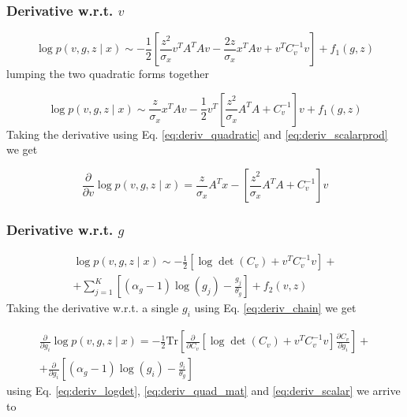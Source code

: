 \documentclass{paper}
\begin{document}
\subsubsection{Derivative w.r.t. $v$}

\begin{equation}
\log p(v,g,z \mid x) \sim - \frac{1}{2} \left[ \frac{z^2}{ \sigma_x} v^TA^TAv - \frac{2z}{ \sigma_x}  x^TAv +  v^T C_v^{-1} v \right]  + f_1(g,z)
\end{equation}
%
lumping the two quadratic forms together

\begin{equation}
\log p(v,g,z \mid x) \sim \frac{z}{ \sigma_x}  x^TAv -  \frac{1}{2} v^T \left[ \frac{z^2}{\sigma_x}A^TA + C_v^{-1} \right] v + f_1(g,z)
\end{equation}
%
Taking the derivative using Eq. \ref{eq:deriv_quadratic} and \ref{eq:deriv_scalarprod} we get

\begin{equation}
\frac{\partial}{\partial v} \log p(v,g,z \mid x) =  \frac{z}{ \sigma_x}  A^Tx - \left[ \frac{z^2}{\sigma_x}A^TA + C_v^{-1} \right] v 
\end{equation}


\subsubsection{Derivative w.r.t. $g$}

\begin{equation}
\begin{split}
\log p(v,g,z \mid x) \sim - \frac{1}{2} \left[ \log \det \left( C_v \right) + v^T C_v^{-1} v \right] + \\
+ \sum_{j=1}^K \left[ (\alpha_g - 1) \log(g_j) - \frac{g_j}{\theta_g} \right]   + f_2(v,z)
\end{split}
\end{equation}
%
Taking the derivative w.r.t. a single $g_i$ using Eq. \ref{eq:deriv_chain} we get

\begin{equation}
\begin{split}
\frac{\partial}{\partial g_i} \log p(v,g,z \mid x) =  - \frac{1}{2} \textrm{Tr} \left[ \frac{\partial}{\partial C_v} \left[ \log \det \left( C_v \right) + v^T C_v^{-1} v \right] \frac{\partial C_v}{\partial g_i}\right]  + \\
+ \frac{\partial}{\partial g_i} \left[ (\alpha_g - 1) \log(g_i) - \frac{g_i}{\theta_g} \right]
\end{split}
\end{equation}
%
using Eq. \ref{eq:deriv_logdet}, \ref{eq:deriv_quad_mat} and \ref{eq:deriv_scalar} we arrive to
\end{document}
